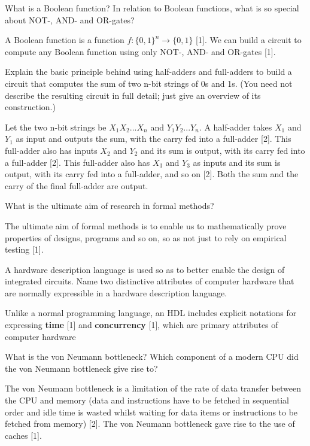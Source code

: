\documentclass{exam}
\begin{document}
\begin{questions}
\question[2]What is a Boolean function? In relation to Boolean functions, what is
so special about NOT-, AND- and OR-gates?
\begin{solution}[.2in]
A Boolean function is a function $f:\{0, 1\}^n \rightarrow \{0, 1\}$ [1]. We can build
a circuit to compute any Boolean function using only NOT-, AND- and
OR-gates [1].
\end{solution}
\newpage
\question[6]Explain the basic principle behind using half-adders and full-adders to
build a circuit that computes the sum of two n-bit strings of 0s and 1s.
(You need not describe the resulting circuit in full detail; just give an
overview of its construction.)
\begin{solution}[.2in]
{\small Let the two n-bit strings be $X_1X_2 ... X_n$ and $Y_1Y_2 . . . Y_n$. A half-adder
	takes $X_1$ and $Y_1$ as input and outputs the sum, with the carry fed into
	a full-adder [2]. This full-adder also has inputs $X_2$ and $Y_2$ and its sum
	is output, with its carry fed into a full-adder [2]. This full-adder also
	has $X_3$ and $Y_3$ as inputs and its sum is output, with its carry fed into
	a full-adder, and so on [2]. Both the sum and the carry of the final
	full-adder are output.}
\end{solution}

\question[1]What is the ultimate aim of research in formal methods?
\begin{solution}[.2in]
The ultimate aim of formal methods is to enable us to mathematically
prove properties of designs, programs and so on, so as not just to rely
on empirical testing [1].
\end{solution}

\question[2]A hardware description language is used so as to better enable the
design of integrated circuits. Name two distinctive attributes of computer
hardware that are normally expressible in a hardware description
language.
\begin{solution}[.2in]
Unlike a normal programming language, an HDL includes explicit notations
for expressing \textbf{time} [1] and \textbf{concurrency} [1], which are primary
attributes of computer hardware
\end{solution}

\question[3]What is the von Neumann bottleneck? Which component of a modern
CPU did the von Neumann bottleneck give rise to?
\begin{solution}[.2in]
The von Neumann bottleneck is a limitation of the rate of data transfer
between the CPU and memory (data and instructions have to be
fetched in sequential order and idle time is wasted whilst waiting for
data items or instructions to be fetched from memory) [2]. The von
Neumann bottleneck gave rise to the use of caches [1].
\end{solution}



\end{questions}
\end{document}
